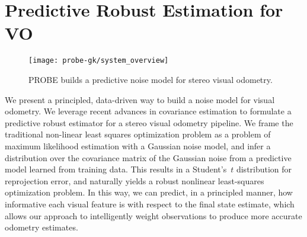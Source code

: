 \section{Predictive Robust Estimation for VO}

\begin{figure}
    \centering
      \texttt{[image: probe-gk/system\_overview]}
      \caption{PROBE builds a predictive noise model for stereo visual odometry.}
    \label{fig:probe_gk_system}
\end{figure}


We present a principled, data-driven way to build a noise model
for visual odometry. We leverage recent advances in covariance estimation
\citep{VegaBrown:2013fv} to formulate a predictive robust estimator for a
stereo visual odometry pipeline. We frame the traditional non-linear least
squares optimization problem as a problem of maximum likelihood estimation with
a Gaussian noise model, and infer a distribution over the covariance matrix of
the Gaussian noise from a predictive model learned from training data. This
results in a Student's~$t$ distribution for reprojection error, and naturally yields a
robust nonlinear least-squares optimization problem.  In this way, we can predict,
in a principled manner, how informative each visual feature is with respect to the final state
estimate, which allows our approach to intelligently weight observations to
produce more accurate odometry estimates.  
